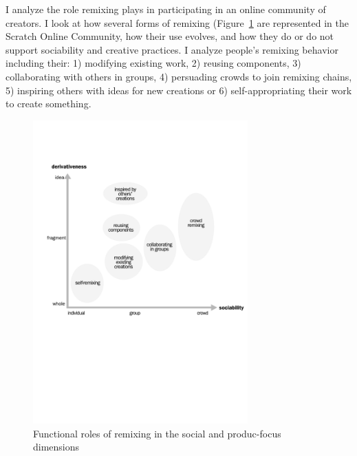 I analyze the role remixing plays in participating in an online community of creators.
I look at how several forms of remixing (Figure~\ref{fig:function} are represented in the Scratch Online Community, how their use evolves, and how they do or do not support sociability and creative practices.
I analyze people's remixing behavior including their: 
1) modifying existing work, 
2) reusing components, 
3) collaborating with others in groups, 
4) persuading crowds to join remixing chains, 
5) inspiring others with ideas for new creations or 
6) self-appropriating their work to create something. 

\begin{figure}
\centering
\includegraphics[width=3.25in]{figures/function.pdf}
\caption{Functional roles of remixing in the social and produc-focus dimensions}
\label{fig:function}
\end{figure}

